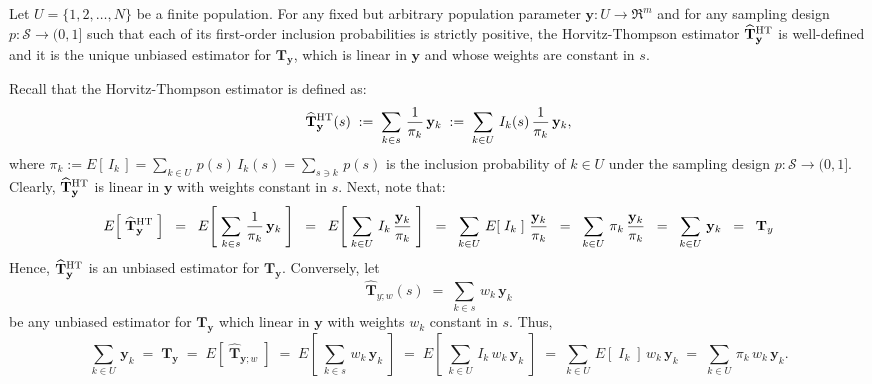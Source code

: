 \documentclass{article}
\begin{document}
\begin{corollary}
\mbox{}
\vskip 0.2cm
\noindent
Let $U = \{1,2,\ldots,N\}$ be a finite population.
For any fixed but arbitrary population parameter $\mathbf{y} : U \longrightarrow \Re^{m}$ and
for any sampling design $p : \mathcal{S} \longrightarrow (0,1]$ such that each of
its first-order inclusion probabilities is strictly positive,
the Horvitz-Thompson estimator $\widehat{\mathbf{T}}^{\textnormal{HT}}_{\mathbf{y}}$ is well-defined
and it is the unique unbiased estimator for $\mathbf{T}_{\mathbf{y}}$, which is linear in $\mathbf{y}$ and
whose weights are constant in $s$.
\end{corollary}

\proof
Recall that the Horvitz-Thompson estimator is defined as:
\begin{equation*}
\widehat{\mathbf{T}}^{\textnormal{HT}}_{\mathbf{y}}(s)
\;:=\; \sum_{k \in s}\,\dfrac{1}{\pi_{k}}\,\mathbf{y}_{k}
\;:=\; \sum_{k \in U}\,I_{k}(s)\,\dfrac{1}{\pi_{k}}\,\mathbf{y}_{k},
\end{equation*}
where $\pi_{k} := E\!\left[\,I_{k}\,\right] = \underset{k \in U}{\sum}\,p(s)\,I_{k}(s) = \underset{s \ni k}{\sum}\,p(s)$
is the inclusion probability of $k \in U$ under the sampling design $p : \mathcal{S} \longrightarrow (0,1]$.
Clearly, $\widehat{\mathbf{T}}^{\textnormal{HT}}_{\mathbf{y}}$ is linear in $\mathbf{y}$ with weights constant in $s$.
Next, note that:
\begin{equation*}
E\!\left[\;\widehat{\mathbf{T}}^{\textnormal{HT}}_{\mathbf{y}}\;\right]
\;\;=\;\; E\!\left[\;\sum_{k \in s}\,\dfrac{1}{\pi_{k}}\,\mathbf{y}_{k}\;\right]
\;\;=\;\; E\!\left[\;\sum_{k \in U}\,I_{k}\,\dfrac{\mathbf{y}_{k}}{\pi_{k}}\;\right]
\;\;=\;\; \sum_{k \in U}\,E\!\left[\;I_{k}\;\right]\,\dfrac{\mathbf{y}_{k}}{\pi_{k}}
\;\;=\;\; \sum_{k \in U}\,\pi_{k}\,\dfrac{\mathbf{y}_{k}}{\pi_{k}}
\;\;=\;\; \sum_{k \in U}\,\mathbf{y}_{k} \;\; = \;\; \mathbf{T}_{y}
\end{equation*}
Hence, $\widehat{\mathbf{T}}^{\textnormal{HT}}_{\mathbf{y}}$ is an unbiased estimator for $\mathbf{T}_{\mathbf{y}}$.
Conversely, let
\begin{equation*}
\widehat{\mathbf{T}}_{y;w}(s) \; = \; \sum_{k \in s}\,w_{k}\,\mathbf{y}_{k}
\end{equation*}
be any unbiased estimator for $\mathbf{T}_{\mathbf{y}}$ which linear in $\mathbf{y}$ with weights $w_{k}$ constant in $s$.
Thus,
\begin{equation*}
\sum_{k \in U}\,\mathbf{y}_{k}
\;=\; \mathbf{T}_{\mathbf{y}}
\;=\; E\!\left[\;\widehat{\mathbf{T}}_{\mathbf{y};w}\;\right]
\;=\; E\!\left[\;\sum_{k \in s}\,w_{k}\,\mathbf{y}_{k}\;\right]
\;=\; E\!\left[\;\sum_{k \in U}\,I_{k}\,w_{k}\,\mathbf{y}_{k}\;\right]
\;=\; \sum_{k \in U}\,E\!\left[\;I_{k}\;\right]\,w_{k}\,\mathbf{y}_{k}
\;=\; \sum_{k \in U}\,\pi_{k}\,w_{k}\,\mathbf{y}_{k}.
\end{equation*}
\end{document}
